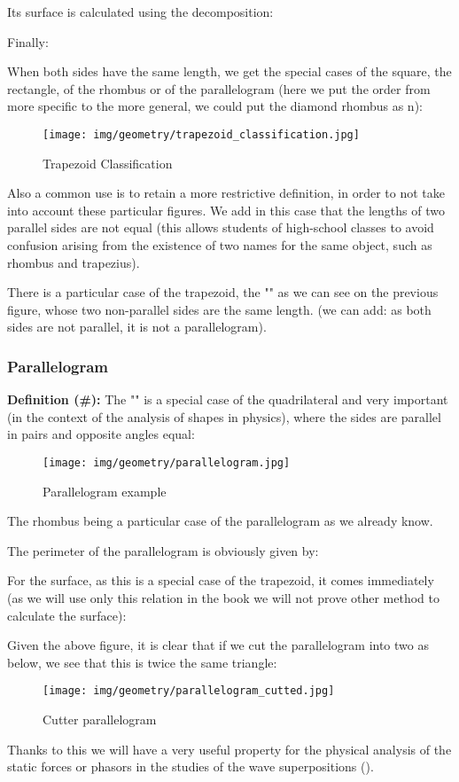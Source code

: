 {	Its surface is calculated using the decomposition:
	
	Finally:
	
	When both sides have the same length, we get the special cases of the square, the rectangle, of the rhombus or of the parallelogram (here we put the order from more specific to the more general, we could put the diamond rhombus as n):
	\begin{figure}[H]
		\centering
		\texttt{[image: img/geometry/trapezoid\_classification.jpg]}
		\caption{Trapezoid Classification}
	\end{figure}
	Also a common use is to retain a more restrictive definition, in order to not take into account these particular figures. We add in this case that the lengths of two parallel sides are not equal (this allows students of high-school classes to avoid confusion arising from the existence of two names for the same object, such as rhombus and trapezius).
	
	\begin{tcolorbox}[title=Remark,colframe=black,arc=10pt]
	There is a particular case of the trapezoid, the "" as we can see on the previous figure, whose two non-parallel sides are the same length. (we can add: as both sides are not parallel, it is not a parallelogram).
	\end{tcolorbox}
	
	\subsubsection{Parallelogram}
	\textbf{Definition (\#\mydef):} The "" is a special case of the quadrilateral and very important (in the context of the analysis of shapes in physics), where the sides are parallel in pairs and opposite angles equal:
	\begin{figure}[H]
		\centering
		\texttt{[image: img/geometry/parallelogram.jpg]}
		\caption{Parallelogram example}
	\end{figure}
	The rhombus being a particular case of the parallelogram as we already know.
	
	The perimeter of the parallelogram is obviously given by:
	
	For the surface, as this is a special case of the trapezoid, it comes immediately (as we will use only this relation in the book we will not prove other method to calculate the surface):
	
	Given the above figure, it is clear that if we cut the parallelogram into two as below, we see that this is twice the same triangle:
	\begin{figure}[H]
		\centering
		\texttt{[image: img/geometry/parallelogram\_cutted.jpg]}
		\caption{Cutter parallelogram}
	\end{figure}
	Thanks to this we will have a very useful property for the physical analysis of the static forces or phasors in the studies of the wave superpositions ().
	
}
